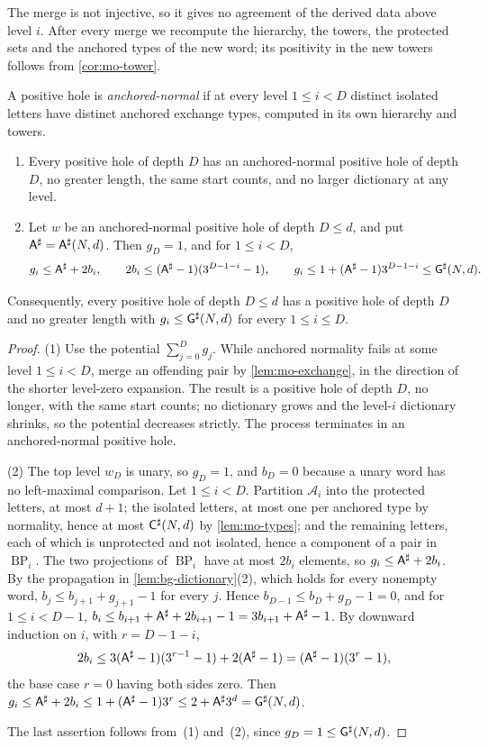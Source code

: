 The merge is not injective, so it gives no agreement of the derived data
above level $i$. After every merge we recompute the hierarchy, the towers, the
protected sets and the anchored types of the new word; its positivity in the
new towers follows from \cref{cor:mo-tower}.

A positive hole is \emph{anchored-normal} if at every level $1\le i<D$ distinct
isolated letters have distinct anchored exchange types, computed in its own
hierarchy and towers.

\begin{lemma}\label{lem:mo-dictionary}
\leavevmode
\begin{enumerate}[leftmargin=*]
\item Every positive hole of depth $D$ has an anchored-normal positive hole of
  depth $D$, no greater length, the same start counts, and no larger dictionary
  at any level.
\item Let $w$ be an anchored-normal positive hole of depth $D\le d$, and put
  $\mathsf{A}^{\sharp}=\mathsf{A}^{\sharp}(N,d)$. Then $g_D=1$, and for $1\le i<D$,
  \[
   g_i\le\mathsf{A}^{\sharp}+2b_i,\qquad
   2b_i\le(\mathsf{A}^{\sharp}-1)(3^{D-1-i}-1),\qquad
   g_i\le1+(\mathsf{A}^{\sharp}-1)3^{D-1-i}\le\mathsf{G}^{\sharp}(N,d).
  \]
\end{enumerate}
Consequently, every positive hole of depth $D\le d$ has a positive hole of depth
$D$ and no greater length with $g_i\le\mathsf{G}^{\sharp}(N,d)$ for every $1\le i\le D$.
\end{lemma}

\begin{proof}
(1) Use the potential $\sum_{j=0}^Dg_j$. While anchored normality fails at some
level $1\le i<D$, merge an offending pair by \cref{lem:mo-exchange}, in the
direction of the shorter level-zero expansion. The result is a positive hole of
depth $D$, no longer, with the same start counts; no dictionary grows and the
level-$i$ dictionary shrinks, so the potential decreases strictly. The process
terminates in an anchored-normal positive hole.

(2) The top level $w_D$ is unary, so $g_D=1$, and $b_D=0$ because a unary word
has no left-maximal comparison. Let $1\le i<D$. Partition $\mathcal A_i$ into
the protected letters, at most $d+1$; the isolated letters, at most one per
anchored type by normality, hence at most $\mathsf{C}^{\sharp}(N,d)$ by
\cref{lem:mo-types}; and the remaining letters, each of which is unprotected and
not isolated, hence a component of a pair in $\operatorname{BP}_i$. The two
projections of $\operatorname{BP}_i$ have at most $2b_i$ elements, so
$g_i\le\mathsf{A}^{\sharp}+2b_i$. By the propagation in \cref{lem:bg-dictionary}(2), which
holds for every nonempty word, $b_j\le b_{j+1}+g_{j+1}-1$ for every $j$. Hence
$b_{D-1}\le b_D+g_D-1=0$, and for $1\le i<D-1$,
$b_i\le b_{i+1}+\mathsf{A}^{\sharp}+2b_{i+1}-1=3b_{i+1}+\mathsf{A}^{\sharp}-1$. By downward induction
on $i$, with $r=D-1-i$,
\[
 2b_i\le3(\mathsf{A}^{\sharp}-1)(3^{r-1}-1)+2(\mathsf{A}^{\sharp}-1)=(\mathsf{A}^{\sharp}-1)(3^r-1),
\]
the base case $r=0$ having both sides zero. Then
$g_i\le\mathsf{A}^{\sharp}+2b_i\le1+(\mathsf{A}^{\sharp}-1)3^r\le2+\mathsf{A}^{\sharp}3^d=\mathsf{G}^{\sharp}(N,d)$.

The last assertion follows from~(1) and~(2), since $g_D=1\le\mathsf{G}^{\sharp}(N,d)$.
\end{proof}

